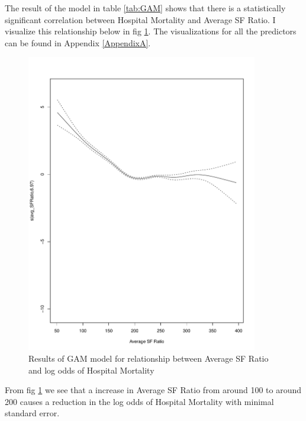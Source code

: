 The result of the model in table \ref{tab:GAM} shows that there is a statistically significant correlation between Hospital Mortality and Average SF Ratio. I visualize this relationship below in fig \ref{fig:GAM}. The visualizations for all the predictors can be found in Appendix \ref{AppendixA}. 

\begin{figure}[H]
  \centering
    \includegraphics[width=0.9\textwidth]{figures/GAM-AVGSF.pdf}
  \caption{Results of GAM model for relationship between Average SF Ratio and log odds of Hospital Mortality}
  \label{fig:GAM}
\end{figure}

From fig \ref{fig:GAM} we see that a increase in Average SF Ratio from around 100 to around 200 causes a reduction in the log odds of Hospital Mortality with minimal standard error.  


